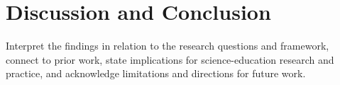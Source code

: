 \section{Discussion and Conclusion}\label{sec:discussion}


Interpret the findings in relation to the research questions and framework,
connect to prior work, state implications for science-education research and
practice, and acknowledge limitations and directions for future work.
